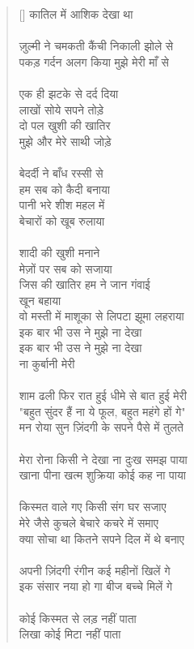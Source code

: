 \begin{verse}[\versewidth]
{कातिल में आशिक देखा था\\
\\
ज़ुल्मी ने चमकती कैंची निकाली झोले से\\
पकड़ गर्दन अलग किया मुझे मेरी माँ से\\
\\
एक ही झटके से दर्द दिया \\
लाखों सोये सपने तोड़े\\
दो पल खुशी की खातिर \\
मुझे और मेरे साथी जोड़े\\
\\
बेदर्दी ने बाँध रस्सी से \\
हम सब को कैदी बनाया\\
पानी भरे शीश महल में \\
बेचारों को खूब रुलाया\\
\\
शादी की खुशी मनाने \\
मेज़ों पर सब को सजाया\\
जिस की खातिर हम ने जान गंवाई \\
खून बहाया\\
वो मस्ती में माशूका से लिपटा झूमा लहराया\\
इक बार भी उस ने मुझे ना देखा\\
इक बार भी उस ने मुझे ना देखा \\
ना कुर्बानी मेरी\\
\\
शाम ढली फिर रात हुई धीमे से बात हुई मेरी\\
"बहुत सुंदर हैं ना ये फूल, बहुत महंगे हों गे"\\
मन रोया सुन ज़िंदगी के सपने पैसे में तुलते\\
\\
मेरा रोना किसी ने देखा ना दुःख समझ पाया\\
खाना पीना खत्म शुक्रिया कोई कह ना पाया\\
\\
किस्मत वाले गए किसी संग घर सजाए\\
मेरे जैसे कुचले बेचारे कचरे में समाए\\
क्या सोचा था कितने सपने दिल में थे बनाए\\
\\
अपनी ज़िंदगी रंगीन कई महीनों खिलें गे\\
इक संसार नया हो गा बीज बच्चे मिलें गे\\
\\
कोई किस्मत से लड़ नहीं पाता\\
लिखा कोई मिटा नहीं पाता\\
}
\end{verse}

